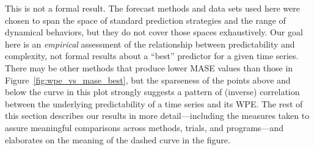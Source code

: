 This is not a formal result.  The forecast methods and data sets used
here were chosen to span the space of standard prediction strategies
and the range of dynamical behaviors, but they do not cover those
spaces exhaustively.  Our goal here is an \emph{empirical} assessment
of the relationship between predictability and complexity, not formal
results about a ``best'' predictor for a given time series.  There may
be other methods that produce lower MASE values than those in
Figure~\ref{fig:wpe_vs_mase_best}, but the sparseness of the points
above and below the curve in this plot strongly suggests a pattern of
(inverse) correlation between the underlying predictability of a time
series and its WPE.  The rest of this section describes our results in
more detail---including the measures taken to assure meaningful
comparisons across methods, trials, and programs---and elaborates on
the meaning of the dashed curve in the figure.

